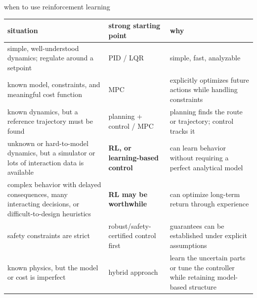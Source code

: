 \documentclass[xcolor=dvipsnames]{beamer}
\begin{document}
\begin{frame}{when to use reinforcement learning}
\tiny
\centering
\centering

\hspace*{-0.8cm}%
\begin{tabular}{|p{3.3cm}|p{2.8cm}|p{4.5cm}|}
\hline
\centering\textbf{situation} &
\centering\textbf{strong starting point} &
\centering\arraybackslash\textbf{why} \\
\hline

simple, well-understood dynamics; regulate around a setpoint
& PID / LQR
& simple, fast, analyzable \\
\hline

known model, constraints, and meaningful cost function
& MPC
& explicitly optimizes future actions while handling constraints \\
\hline

known dynamics, but a reference trajectory must be found
& planning + control / MPC
& planning finds the route or trajectory; control tracks it \\
\hline

unknown or hard-to-model dynamics, but a simulator or lots of interaction data is available
& \textbf{RL, or learning-based control}
& can learn behavior without requiring a perfect analytical model \\
\hline

complex behavior with delayed consequences, many interacting decisions, or difficult-to-design heuristics
& \textbf{RL may be worthwhile}
& can optimize long-term return through experience \\
\hline

safety constraints are strict
& robust/safety-certified control first
& guarantees can be established under explicit assumptions \\
\hline

known physics, but the model or cost is imperfect
& hybrid approach
& learn the uncertain parts or tune the controller while retaining model-based structure \\
\hline
\end{tabular}

\end{frame}
\end{document}
